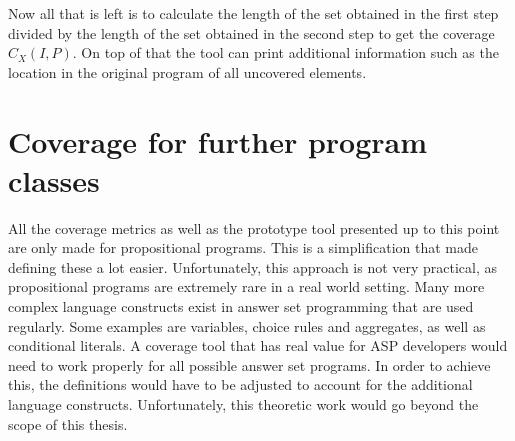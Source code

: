 Now all that is left is to calculate the length of the set obtained in the first step divided by the length of the set obtained in the second step to get the coverage \(C_X(I, P)\). On top of that the tool can print additional information such as the location in the original program of all uncovered elements.

\begin{comment}
show in general terms:
- how i am using the AST of the program to gather information about rules and (definable) atoms
    - what information is gathered? why? how is it stored?  \/

- how i am using ProgramBuilders to add new rules to the program using the gathered information (obviously only add what is necessary based on which metric should be computed)         \/

- how i read the label atoms from the answer sets and use them to calculate the coverage (plus printing information about covered / not covered elements is possible)           \/
    - how is the program solved? (brave/cautious using clingo...) how do i gather the resulting models/the contained atoms? how do i compute coverage from the gathered atoms?      \/
\end{comment}


\chapter{Coverage for further program classes}
\label{ch:Coverage for further program classes}
All the coverage metrics as well as the prototype tool presented up to this point are only made for propositional programs. This is a simplification that made defining these a lot easier. Unfortunately, this approach is not very practical, as propositional programs are extremely rare in a real world setting. Many more complex language constructs exist in answer set programming that are used regularly. Some examples are variables, choice rules and aggregates, as well as conditional literals. A coverage tool that has real value for ASP developers would need to work properly for all possible answer set programs. In order to achieve this, the definitions would have to be adjusted to account for the additional language constructs. Unfortunately, this theoretic work would go beyond the scope of this thesis. 

